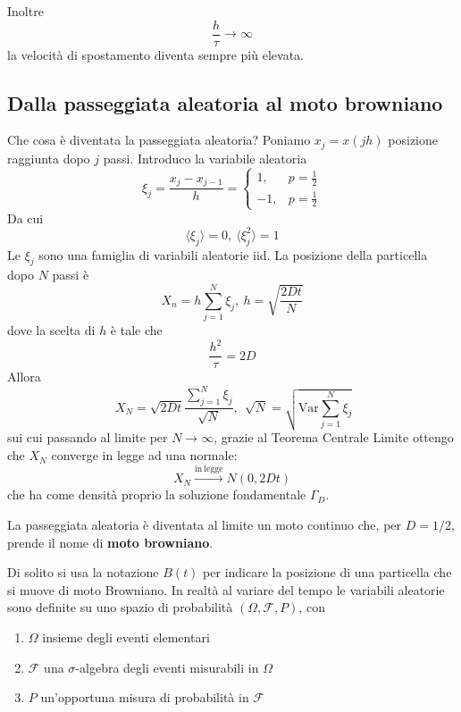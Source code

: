 \documentclass[10pt,a4paper,twoside,openright]{book}
\begin{document}
Inoltre 
\begin{equation*}
\frac{h}{\tau }\rightarrow \infty 
\end{equation*}
la velocità di spostamento diventa sempre più elevata.
\subsection{Dalla passeggiata aleatoria al moto browniano}

Che cosa è diventata la passeggiata aleatoria? Poniamo $\displaystyle x_{j} =x(jh)$ posizione raggiunta dopo $\displaystyle j$ passi. Introduco la variabile aleatoria
\begin{equation*}
\xi _{j} =\frac{x_{j} -x_{j-1}}{h} =\begin{cases}
1, & p=\frac{1}{2}\\
-1, & p=\frac{1}{2}
\end{cases}
\end{equation*}
Da cui
\begin{equation*}
\langle \xi _{j} \rangle =0,\ \langle \xi ^{2}_{j} \rangle =1
\end{equation*}
Le $\displaystyle \xi _{j}$ sono una famiglia di variabili aleatorie iid. La posizione della particella dopo $\displaystyle N$ passi è 
\begin{equation*}
X_{n} =h\sum ^{N}_{j=1} \xi _{j},\ h=\sqrt{\frac{2Dt}{N}}
\end{equation*}
dove la scelta di $\displaystyle h$ è tale che 
\begin{equation*}
\frac{h^{2}}{\tau } =2D
\end{equation*}
Allora
\begin{equation*}
\ X_{N} =\sqrt{2Dt}\frac{\sum\nolimits ^{N}_{j=1} \xi _{j}}{\sqrt{N}},\ \ \sqrt{N} =\sqrt{\mathrm{Var}\sum ^{N}_{j=1} \xi _{j}}
\end{equation*}
sui cui passando al limite per $\displaystyle N\rightarrow \infty $, grazie al Teorema Centrale Limite ottengo che $\displaystyle X_{N}$ converge in legge ad una normale:
\begin{equation*}
X_{N}\xrightarrow{\mathrm{in\ legge}} N(0,2Dt)
\end{equation*}
che ha come densità proprio la soluzione fondamentale $\displaystyle \Gamma _{D}$.

La passeggiata aleatoria è diventata al limite un moto continuo che, per $\displaystyle D=1/2$, prende il nome di \textbf{moto browniano}.

Di solito si usa la notazione $\displaystyle B(t)$ per indicare la posizione di una particella che si muove di moto Browniano. In realtà al variare del tempo le variabili aleatorie sono definite su uno spazio di probabilità $\displaystyle ( \Omega,\mathcal{F},P)$, con 
\begin{enumerate}
\item $\displaystyle \Omega $ insieme degli eventi elementari
\item $\displaystyle \mathcal{F}$ una $\displaystyle \sigma $-algebra degli eventi misurabili in $\displaystyle \Omega $
\item $\displaystyle P$ un'opportuna misura di probabilità in $\displaystyle \mathcal{F}$
\end{enumerate}
\end{document}
